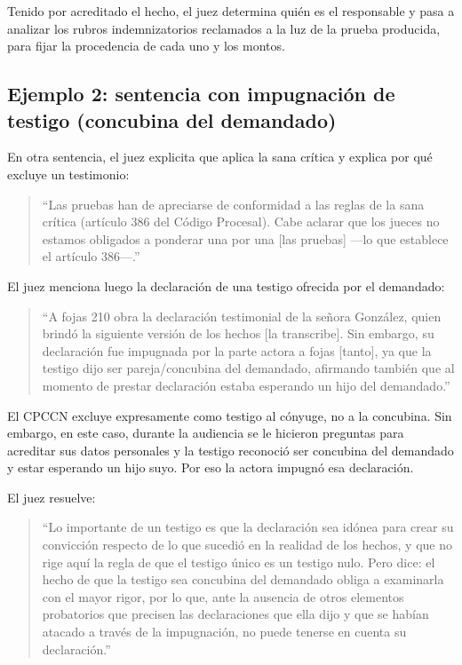 \documentclass[12pt,oneside]{book}
\begin{document}
Tenido por acreditado el hecho, el juez determina quién es el responsable y pasa a analizar los rubros indemnizatorios reclamados a la luz de la prueba producida, para fijar la procedencia de cada uno y los montos.

\subsection{Ejemplo 2: sentencia con impugnación de testigo (concubina del demandado)}

En otra sentencia, el juez explicita que aplica la sana crítica y explica por qué excluye un testimonio:

\begin{quote}
``Las pruebas han de apreciarse de conformidad a las reglas de la sana crítica (artículo 386 del Código Procesal). Cabe aclarar que los jueces no estamos obligados a ponderar una por una [las pruebas] ---lo que establece el artículo 386---.''
\end{quote}

El juez menciona luego la declaración de una testigo ofrecida por el demandado:

\begin{quote}
``A fojas 210 obra la declaración testimonial de la señora González, quien brindó la siguiente versión de los hechos [la transcribe]. Sin embargo, su declaración fue impugnada por la parte actora a fojas [tanto], ya que la testigo dijo ser pareja/concubina del demandado, afirmando también que al momento de prestar declaración estaba esperando un hijo del demandado.''
\end{quote}

El CPCCN excluye expresamente como testigo al cónyuge, no a la concubina. Sin embargo, en este caso, durante la audiencia se le hicieron preguntas para acreditar sus datos personales y la testigo reconoció ser concubina del demandado y estar esperando un hijo suyo. Por eso la actora impugnó esa declaración.

El juez resuelve:

\begin{quote}
``Lo importante de un testigo es que la declaración sea idónea para crear su convicción respecto de lo que sucedió en la realidad de los hechos, y que no rige aquí la regla de que el testigo único es un testigo nulo. Pero dice: el hecho de que la testigo sea concubina del demandado obliga a examinarla con el mayor rigor, por lo que, ante la ausencia de otros elementos probatorios que precisen las declaraciones que ella dijo y que se habían atacado a través de la impugnación, no puede tenerse en cuenta su declaración.''
\end{quote}
\end{document}

